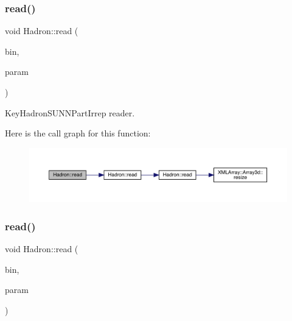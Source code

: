 \subsubsection{\texorpdfstring{read()}{read()}\hspace{0.1cm}{\footnotesize\ttfamily [83/94]}}
{\footnotesize\ttfamily void Hadron\+::read (\begin{DoxyParamCaption}\item[{\mbox{\hyperlink{classADATIO_1_1BinaryReader}{Binary\+Reader}} \&}]{bin,  }\item[{\mbox{\hyperlink{structHadron_1_1KeyHadronSUNNPartIrrepOp__t}{Key\+Hadron\+S\+U\+N\+N\+Part\+Irrep\+Op\+\_\+t}} \&}]{param }\end{DoxyParamCaption})}



Key\+Hadron\+S\+U\+N\+N\+Part\+Irrep reader. 

Here is the call graph for this function\+:\nopagebreak
\begin{figure}[H]
\begin{center}
\leavevmode
\includegraphics[width=350pt]{d1/daf/namespaceHadron_a05878acca51117e3c410ba16500c4ba5_cgraph}
\end{center}
\end{figure}
\mbox{\label{namespaceHadron_a205a666e574892fd5fc22e723a24399e}} 
\subsubsection{\texorpdfstring{read()}{read()}\hspace{0.1cm}{\footnotesize\ttfamily [84/94]}}
{\footnotesize\ttfamily void Hadron\+::read (\begin{DoxyParamCaption}\item[{\mbox{\hyperlink{classADATIO_1_1BinaryReader}{Binary\+Reader}} \&}]{bin,  }\item[{\mbox{\hyperlink{structHadron_1_1KeyHadronNPartIrrepOp__t}{Key\+Hadron\+N\+Part\+Irrep\+Op\+\_\+t}} \&}]{param }\end{DoxyParamCaption})}



